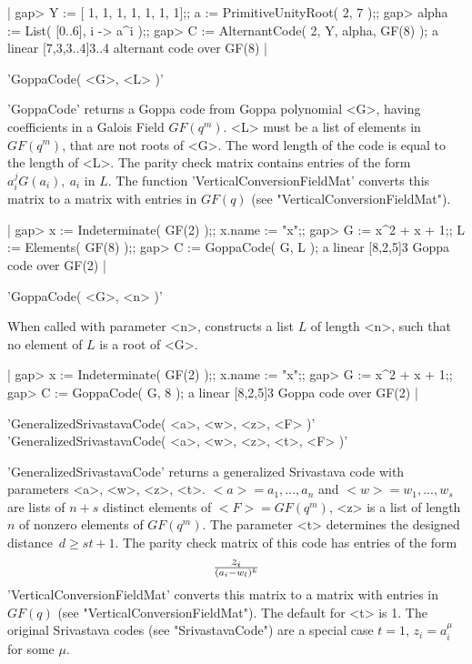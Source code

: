 |    gap> Y := [ 1, 1, 1, 1, 1, 1, 1];; a := PrimitiveUnityRoot( 2, 7 );;
    gap> alpha := List( [0..6], i -> a^i );;
    gap> C := AlternantCode( 2, Y, alpha, GF(8) );
    a linear [7,3,3..4]3..4 alternant code over GF(8) |


'GoppaCode( <G>, <L> )'

'GoppaCode'   returns a  Goppa  code  from  Goppa  polynomial <G>, having
coefficients in a Galois Field $GF(q^m)$. <L> must  be a list of elements
in $GF(q^m)$, that are not roots of <G>.  The word length  of the code is
equal to the length of  <L>. The parity check  matrix contains entries of
the       form   $a_i^j   G(a_i),\    a_i$      in  $L$.   The   function
'VerticalConversionFieldMat' converts   this  matrix  to  a  matrix  with
entries in $GF(q)$ (see "VerticalConversionFieldMat").

|    gap> x := Indeterminate( GF(2) );; x.name := "x";;
    gap> G := x^2 + x + 1;; L := Elements( GF(8) );;
    gap> C := GoppaCode( G, L );
    a linear [8,2,5]3 Goppa code over GF(2) |

'GoppaCode( <G>, <n> )'

When called with parameter <n>, {\GUAVA}  constructs a list $L$ of length
<n>, such that no element of $L$ is a root of <G>.

|    gap> x := Indeterminate( GF(2) );; x.name := "x";;
    gap> G := x^2 + x + 1;;
    gap> C := GoppaCode( G, 8 );
    a linear [8,2,5]3 Goppa code over GF(2) |


'GeneralizedSrivastavaCode( <a>, <w>, <z>, <F> )'\\
'GeneralizedSrivastavaCode( <a>, <w>, <z>, <t>, <F> )'

'GeneralizedSrivastavaCode' returns   a generalized Srivastava  code with
parameters <a>, <w>, <z>, <t>. $<a> = a_1, ..., a_n$ and $<w> = w_1, ...,
w_s$ are lists of $n+s$ distinct elements of $<F>=GF(q^m)$, <z> is a list
of length $n$  of   nonzero elements  of  $GF(q^m)$. The   parameter  <t>
determines the designed  distance\:\ $d  \geq  st + 1$.  The parity check
matrix of this code has entries  of the form $$z_i  \over {(a_i - w_l)^k}
$$  'VerticalConversionFieldMat'  converts this matrix  to  a matrix with
entries in  $GF(q)$  (see "VerticalConversionFieldMat").  The default for
<t> is  1.  The original Srivastava codes  (see  "SrivastavaCode") are  a
special case $t=1$, $z_i=a_i^\mu$ for some $\mu$.

